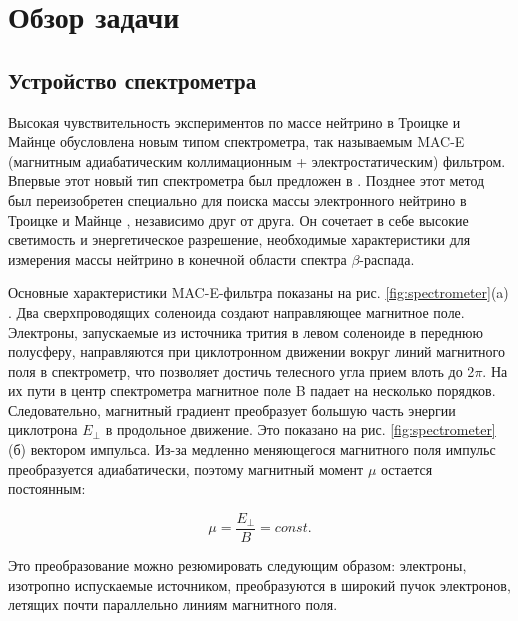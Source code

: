 \documentclass[a4paper,14pt]{extarticle}
\begin{document}


    \newpage
    \section{Обзор задачи}
    \subsection{Устройство спектрометра}
    Высокая чувствительность экспериментов по массе нейтрино в Троицке и Майнце обусловлена
    новым типом спектрометра, так называемым MAC-E (магнитным адиабатическим коллимационным
    + электростатическим) фильтром. Впервые этот новый тип спектрометра был предложен
    в \cite{Beamson_1980}. Позднее этот метод был переизобретен специально для поиска массы электронного
    нейтрино в Троицке и Майнце \cite{lobashev} \cite{picard}, независимо друг от друга. Он сочетает в 
    себе высокие светимость и энергетическое разрешение, необходимые характеристики для измерения 
    массы нейтрино в конечной области спектра $\beta$-распада.
    
    Основные характеристики MAC-E-фильтра показаны на рис. \ref{fig:spectrometer}(a) \cite{design_report}. 
    Два сверхпроводящих соленоида создают направляющее магнитное поле. Электроны, запускаемые 
    из источника трития в левом соленоиде в переднюю полусферу, направляются при
    циклотронном движении вокруг линий магнитного поля в спектрометр, что позволяет достичь
    телесного угла прием влоть до 2$\pi$. На их пути в центр спектрометра
    магнитное поле B падает на несколько порядков. Следовательно, магнитный градиент
    преобразует большую часть энергии циклотрона $E_\perp$ в продольное движение. Это
    показано на рис. \ref{fig:spectrometer}(б) вектором импульса. Из-за медленно меняющегося магнитного 
    поля импульс преобразуется адиабатически, поэтому магнитный момент $\mu$ остается постоянным:
    
    \begin{equation}\label{adiabat}
        \mu = \frac{E_\perp}{B} = const.
    \end{equation}
    
    Это преобразование можно резюмировать следующим образом: электроны, изотропно испускаемые
    источником, преобразуются в широкий пучок электронов, летящих почти параллельно линиям
    магнитного поля.
    
\end{document}
